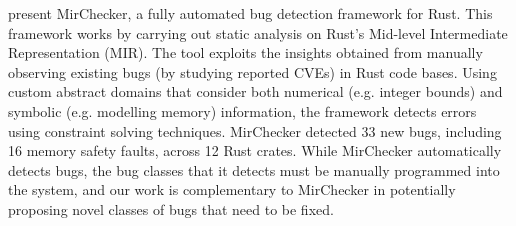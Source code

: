 \cite{li2021mirchecker} present MirChecker, a fully automated bug detection framework for Rust. This framework works by carrying out static analysis on Rust's Mid-level Intermediate Representation (MIR). The tool exploits the insights obtained from manually observing existing bugs (by studying reported CVEs) in Rust code bases. Using custom abstract domains that consider both numerical (e.g. integer bounds) and symbolic (e.g. modelling memory) information, the framework detects errors using constraint solving techniques. MirChecker detected 33 new bugs, including 16 memory safety faults, across 12 Rust crates. While MirChecker automatically detects bugs, the bug classes that it detects must be manually programmed into the system, and our work is complementary to MirChecker in potentially proposing novel classes of bugs that need to be fixed.

